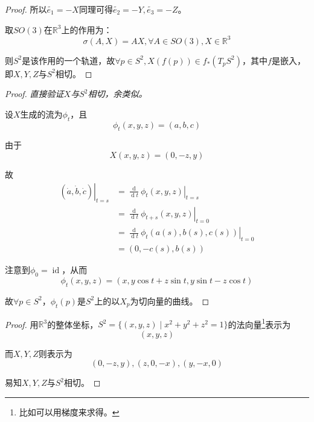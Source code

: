 \documentclass[winfonts,UTF8,c5size,a4paper,fancyhdr,hyperref,titlepage,nocap]{ctexart}
\theoremstyle{definition}
\theoremstyle{remark}
\numberwithin{equation}{subsection}
\newcommand{\Real}{\mathbb{R}}
\newcommand{\dt}{\frac{\operatorname{d}}{\operatorname{d}t}}
\newcommand{\local}[2]{\left.{#1}\right|_{#2}}%
\newcommand{\localt}[1]{\local{#1}{t=0}}%
\newcommand{\id}{\operatorname{id}}
\begin{document}
\begin{proof}
  所以$\widetilde{e_1}=-X$同理可得$\widetilde{e_2}=-Y,\widetilde{e_3}=-Z$。

  取$SO(3)$在$\Real^3$上的作用为：
  \begin{equation*}
  \sigma(A,X)=AX, \forall A\in SO(3),X\in\Real^3
  \end{equation*}

  则$S^2$是该作用的一个轨道，故$\forall p\in S^2,X(f(p))\in f_{\ast}(T_pS^2)$，其中$f$是嵌入，即$X,Y,Z$与$S^2$相切。
\end{proof}
\begin{proof}
  \emph{直接验证$X$与$S^2$相切，余类似。}

  设$X$生成的流为$\phi_t$，且
  \begin{equation*}
  \phi_t(x,y,z)=(a,b,c)
  \end{equation*}

由于
\begin{equation*}
X(x,y,z)=(0,-z,y)
\end{equation*}

故
\begin{align*}
\local{(\dot{a},\dot{b},\dot{c})}{t=s}&=\local{\dt\phi_t(x,y,z)}{t=s}\\
                                      &=\localt{\dt\phi_{t+s}(x,y,z)}\\
                                      &=\localt{\dt\phi_t(a(s),b(s),c(s))}\\
                                      &=(0,-c(s),b(s))
\end{align*}

注意到$\phi_0=\id$，从而
\begin{equation*}
\phi_t(x,y,z)=(x,y\cos t+z\sin t,y\sin t-z\cos t)
\end{equation*}

故$\forall p\in S^2$，$\phi_t(p)$是$S^2$上的以$X_p$为切向量的曲线。
\end{proof}
\begin{proof}
  用$\Real^3$的整体坐标，$S^2=\{(x,y,z)\mid x^2+y^2+z^2=1\}$的法向量\footnote{比如可以用梯度来求得。}表示为
  \begin{equation*}
    (x,y,z)
  \end{equation*}

  而$X,Y,Z$则表示为
  \begin{equation*}
    (0,-z,y), (z,0,-x),(y,-x,0)
  \end{equation*}

  易知$X,Y,Z$与$S^2$相切。
\end{proof}
\end{document}
